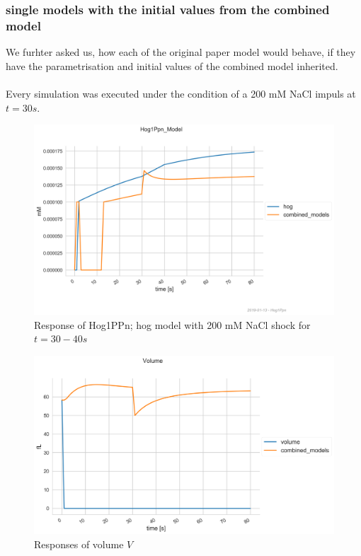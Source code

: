 \subsubsection{single models with the initial values from the combined model}
We furhter asked us, how each of the original paper model would behave, if they have the parametrisation and initial values of the combined model inherited.\\\\
Every simulation was executed under the condition of a 200 mM NaCl impuls at $t=30s$.\\
\begin{figure}[h!]
	\begin{center}
		\begin{minipage}{0,8\textwidth}
			
			\includegraphics[width=\textwidth]{picture/Hog1PPn_71.png}
			\caption{Response of Hog1PPn; hog model with 200 mM NaCl shock for $t=30-40s$} 
			\label{CombiInitHog} 
		\end{minipage}
	\end{center}
\end{figure}
\begin{figure}[h!]
	\begin{center}
		\begin{minipage}{0,8\textwidth}
			
			\includegraphics[width=\textwidth]{picture/r_71.png}
			\caption{Responses of volume $V$} 
			\label{CombiInitVolume} 
		\end{minipage}
	\end{center}
\end{figure}
